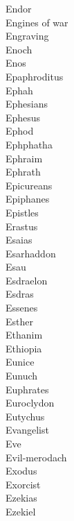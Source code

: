 Endor  \\
Engines of war  \\
Engraving  \\
Enoch  \\
Enos  \\
Epaphroditus  \\
Ephah  \\
Ephesians  \\
Ephesus  \\
Ephod  \\
Ephphatha  \\
Ephraim  \\
Ephrath  \\
Epicureans  \\
Epiphanes  \\
Epistles  \\
Erastus  \\
Esaias  \\
Esarhaddon  \\
Esau  \\
Esdraelon  \\
Esdras  \\
Essenes  \\
Esther  \\
Ethanim  \\
Ethiopia  \\
Eunice  \\
Eunuch  \\
Euphrates  \\
Euroclydon  \\
Eutychus  \\
Evangelist  \\
Eve  \\
Evil-merodach  \\
Exodus  \\
Exorcist  \\
Ezekias  \\
Ezekiel  \\
